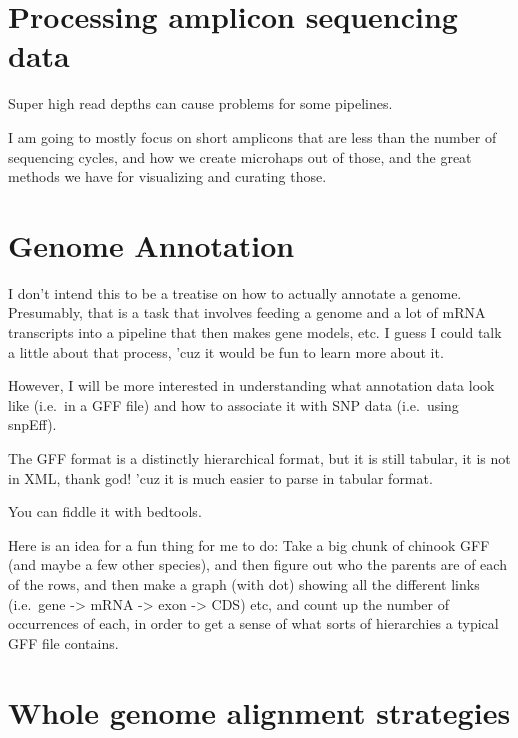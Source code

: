 \documentclass[]{krantz}
\begin{document}
\hypertarget{processing-amplicon-sequencing-data}{%
\chapter{Processing amplicon sequencing data}\label{processing-amplicon-sequencing-data}}

Super high read depths can cause problems for some pipelines.

I am going to mostly focus on short amplicons that are less than the
number of sequencing cycles, and how we create microhaps out of those, and
the great methods we have for visualizing and curating those.

\hypertarget{genome-annotation}{%
\chapter{Genome Annotation}\label{genome-annotation}}

I don't intend this to be a treatise on how to actually annotate a genome.
Presumably, that is a task that involves feeding a genome and a lot of mRNA
transcripts into a pipeline that then makes gene models, etc. I guess I could
talk a little about that process, 'cuz it would be fun to learn more about it.

However, I will be more interested in understanding what annotation data look like
(i.e.~in a GFF file) and how to associate it with SNP data (i.e.~using snpEff).

The GFF format is a distinctly hierarchical format, but it is still tabular,
it is not in XML, thank god! 'cuz it is much easier to parse in tabular format.

You can fiddle it with bedtools.

Here is an idea for a fun thing for me to do: Take a big chunk of chinook GFF
(and maybe a few other species), and then figure out who the parents are of each of the
rows, and then make a graph (with dot) showing all the different links (i.e.~gene -\textgreater{} mRNA -\textgreater{} exon -\textgreater{} CDS)
etc, and count up the number of occurrences of each, in order to get a sense of what
sorts of hierarchies a typical GFF file contains.

\hypertarget{whole-genome-alignment-strategies}{%
\chapter{Whole genome alignment strategies}\label{whole-genome-alignment-strategies}}
\end{document}
